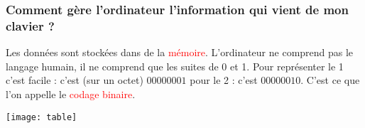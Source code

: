 \documentclass{beamer}
\begin{document}
\begin{frame}
                                                                                                                                                                                                                                                                                                                                                                                                                                                                                                                                                                                                                                                                                                                                                                                                                                                                                                                                                                                                                                                                                                                                                                                                                                                                                                                                                                                                                                                                                                                                                                                                                                                                                                                                                                                                                                                                                                                                                                                                                

\end{frame}

\begin{frame}
\frametitle{Comment gère l'ordinateur l'information qui vient de mon clavier ?}

Les données sont stockées dans de la \textcolor{red}{mémoire}. 
L'ordinateur ne comprend pas le langage humain, il ne comprend que les suites de 0 et 1. Pour représenter le 1 c'est facile : c'est (sur un octet) $00000001$ pour le 2 : c'est $00000010$. C'est ce que l'on appelle le \textcolor{red}{codage binaire}. 
\begin{center}
\texttt{[image: table]}
\end{center}
\end{frame}
\end{document}
